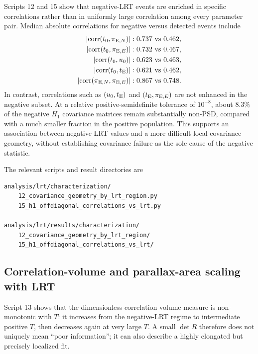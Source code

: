 \documentclass[11pt,a4paper]{article}
\newcommand{\pen}{\pi_{{\rm E},N}}
\newcommand{\pee}{\pi_{{\rm E},E}}
\newcommand{\te}{t_{\rm E}}
\newcommand{\Halt}{H_1}
\begin{document}
Scripts 12 and 15 show that negative-LRT events are enriched in specific
correlations rather than in uniformly large correlation among every parameter
pair.  Median absolute correlations for negative versus detected events include
\begin{align}
 |\mathrm{corr}(t_0,\pen)| &: 0.737 \ \mathrm{vs}\ 0.462,\\
 |\mathrm{corr}(t_0,\pee)| &: 0.732 \ \mathrm{vs}\ 0.467,\\
 |\mathrm{corr}(t_0,u_0)| &: 0.623 \ \mathrm{vs}\ 0.463,\\
 |\mathrm{corr}(t_0,\te)| &: 0.621 \ \mathrm{vs}\ 0.462,\\
 |\mathrm{corr}(\pen,\pee)| &: 0.867 \ \mathrm{vs}\ 0.748.
\end{align}
In contrast, correlations such as $(u_0,\te)$ and $(\te,\pee)$ are not
enhanced in the negative subset.  At a relative positive-semidefinite tolerance
of $10^{-8}$, about $8.3\%$ of the negative $\Halt$ covariance matrices remain
substantially non-PSD, compared with a much smaller fraction in the positive
population.  This supports an association between negative LRT values and a
more difficult local covariance geometry, without establishing covariance
failure as the sole cause of the negative statistic.

The relevant scripts and result directories are
\begin{verbatim}
analysis/lrt/characterization/
    12_covariance_geometry_by_lrt_region.py
    15_h1_offdiagonal_correlations_vs_lrt.py

analysis/lrt/results/characterization/
    12_covariance_geometry_by_lrt_region/
    15_h1_offdiagonal_correlations_vs_lrt/
\end{verbatim}

\subsection{Correlation-volume and parallax-area scaling with LRT}

Script 13 shows that the dimensionless correlation-volume measure is
non-monotonic with $T$: it increases from the negative-LRT regime to intermediate
positive $T$, then decreases again at very large $T$.  A small
$\det R$ therefore does not uniquely mean ``poor information''; it can also
describe a highly elongated but precisely localized fit.
\end{document}
